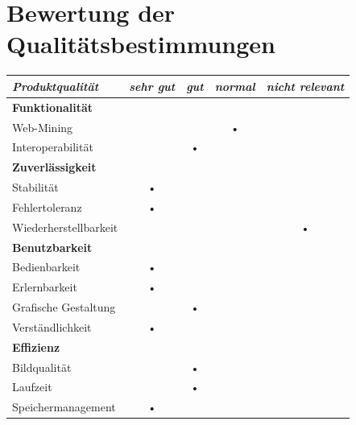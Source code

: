\documentclass[10pt]{scrreprt}
\begin{document}
\section{Bewertung der Qualitätsbestimmungen}
\vspace{1cm}
\begin{center}
\begin{tabular}{lcccc}
\hline 
\rule[-1ex]{0pt}{4ex} \textit{Produktqualität} & \textit{sehr gut} & \textit{gut} & \textit{normal} & \textit{nicht relevant} \\ 
\hline 
\rule[-1ex]{0pt}{4ex} \textbf{Funktionalität} &  &  &  &  \\ 
\rule[-1ex]{0pt}{4ex} \hspace{10pt} Web-Mining & &  & • & \\ 
\rule[-1ex]{0pt}{4ex} \hspace{10pt} Interoperabilität & & • & & \\ 

\hline 
\rule[-1ex]{0pt}{4ex} \textbf{Zuverlässigkeit} &  &  &  &  \\ 
\rule[-1ex]{0pt}{4ex} \hspace{10pt} Stabilität & • & & & \\ 
\rule[-1ex]{0pt}{4ex} \hspace{10pt} Fehlertoleranz & • & & & \\ 
\rule[-1ex]{0pt}{4ex} \hspace{10pt} Wiederherstellbarkeit &  &  &  & • \\ 

\hline 
\rule[-1ex]{0pt}{4ex} \textbf{Benutzbarkeit} &  &  &  &  \\ 
\rule[-1ex]{0pt}{4ex} \hspace{10pt} Bedienbarkeit & • & & & \\ 
\rule[-1ex]{0pt}{4ex} \hspace{10pt} Erlernbarkeit & • & & & \\ 
\rule[-1ex]{0pt}{4ex} \hspace{10pt} Grafische Gestaltung & & • & & \\ 
\rule[-1ex]{0pt}{4ex} \hspace{10pt} Verständlichkeit & • & & & \\ 

\hline 
\rule[-1ex]{0pt}{4ex} \textbf{Effizienz} &  &  &  &  \\ 
\rule[-1ex]{0pt}{4ex} \hspace{10pt} Bildqualität & & • & & \\ 
\rule[-1ex]{0pt}{4ex} \hspace{10pt} Laufzeit & & • & & \\ 
\rule[-1ex]{0pt}{4ex} \hspace{10pt} Speichermanagement & • & & & \\ 


\end{tabular}
\end{center}
\end{document}
